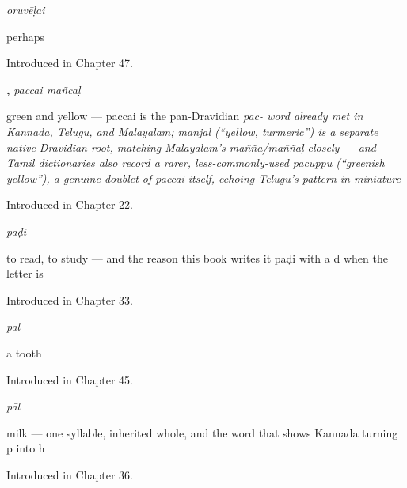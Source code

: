 \noindent\begin{minipage}[t]{\linewidth}
\raggedright
\textbf{}\enspace\emph{oruvēḷai}\par
\small perhaps\par
\footnotesize Introduced in Chapter 47.
\end{minipage}\par\medskip

\noindent\begin{minipage}[t]{\linewidth}
\raggedright
\textbf{, }\enspace\emph{paccai mañcaḷ}\par
\small green and yellow — paccai is the pan-Dravidian \emph{pac- word already met in Kannada, Telugu, and Malayalam; manjal (\textquotedblleft{}yellow, turmeric\textquotedblright{}) is a separate native Dravidian root, matching Malayalam's mañña/maññaḷ closely — and Tamil dictionaries also record a rarer, less-commonly-used pacuppu (\textquotedblleft{}greenish yellow\textquotedblright{}), a genuine doublet of paccai itself, echoing Telugu's pattern in miniature}\par
\footnotesize Introduced in Chapter 22.
\end{minipage}\par\medskip

\noindent\begin{minipage}[t]{\linewidth}
\raggedright
\textbf{}\enspace\emph{paḍi}\par
\small to read, to study — and the reason this book writes it paḍi with a d when the letter is \par
\footnotesize Introduced in Chapter 33.
\end{minipage}\par\medskip

\noindent\begin{minipage}[t]{\linewidth}
\raggedright
\textbf{}\enspace\emph{pal}\par
\small a tooth\par
\footnotesize Introduced in Chapter 45.
\end{minipage}\par\medskip

\noindent\begin{minipage}[t]{\linewidth}
\raggedright
\textbf{}\enspace\emph{pāl}\par
\small milk — one syllable, inherited whole, and the word that shows Kannada turning p into h\par
\footnotesize Introduced in Chapter 36.
\end{minipage}\par\medskip

